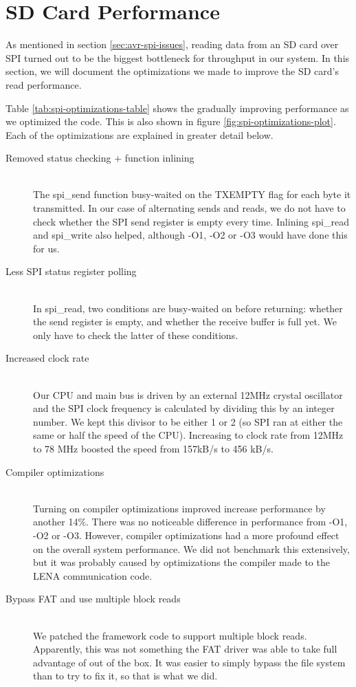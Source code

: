 \section{SD Card Performance}
\label{sec:performance-sd-card}

As mentioned in section \ref{sec:avr-spi-issues}, reading data from an
SD card over SPI turned out to be the biggest bottleneck for throughput
in our system. In this section, we will document the optimizations we
made to improve the SD card's read performance.

Table \ref{tab:spi-optimizations-table} shows the gradually improving
performance as we optimized the code. This is also shown in figure
\ref{fig:spi-optimizations-plot}. Each of the optimizations are
explained in greater detail below.

\begin{description}
	\item[Removed status checking + function inlining] \hfill \\
		The spi\_send function busy-waited on the TXEMPTY flag for each
		byte it transmitted. In our case of alternating sends and reads,
		we do not have to check whether the SPI send register is empty
		every time. Inlining spi\_read and spi\_write also helped,
		although -O1, -O2 or -O3 would have done this for us.
	\item[Less SPI status register polling] \hfill \\
		In spi\_read, two conditions are busy-waited on before
		returning: whether the send register is empty, and whether the
		receive buffer is full yet. We only have to check the latter of
		these conditions.
	\item[Increased clock rate] \hfill \\
		Our CPU and main bus is driven by an external 12MHz crystal
		oscillator and the SPI clock frequency is calculated by dividing
		this by an integer number. We kept this divisor to be either 1
		or 2 (so SPI ran at either the same or half the speed of the
		CPU). Increasing to clock rate from 12MHz to 78 MHz boosted the
		speed from 157kB/s to 456 kB/s.
	\item[Compiler optimizations] \hfill \\
		Turning on compiler optimizations improved increase performance
		by another 14\%. There was no noticeable difference in
		performance from -O1, -O2 or -O3. However, compiler
		optimizations had a more profound effect on the overall system
		performance. We did not benchmark this extensively, but it was
		probably caused by optimizations the compiler made to the \ac{LENA}
		communication code.
	\item[Bypass FAT and use multiple block reads] \hfill \\
		We patched the framework code to support multiple block reads.
		Apparently, this was not something the FAT driver was able to
		take full advantage of out of the box. It was easier to simply
		bypass the file system than to try to fix it, so that is what we
		did.
		

\end{description}
